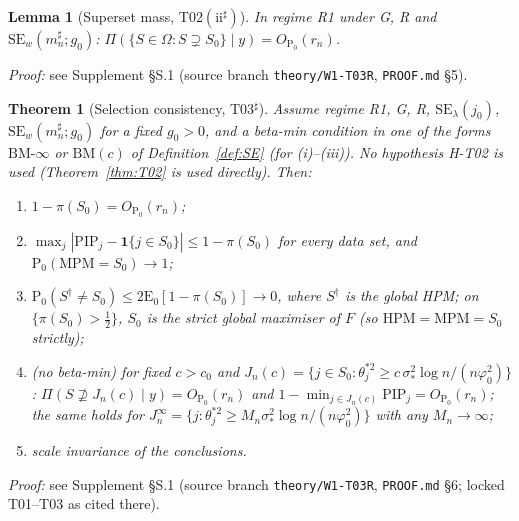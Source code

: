 \documentclass[11pt]{article}
\newtheorem{theorem}{Theorem}
\newtheorem{lemma}{Lemma}
\theoremstyle{definition}
\theoremstyle{remark}
\renewcommand{\Pr}{\mathrm{P}}
\newcommand{\E}{\mathrm{E}}
\newcommand{\Sz}{S_0}
\newcommand{\PIP}{\mathrm{PIP}}
\newcommand{\MPM}{\mathrm{MPM}}
\newcommand{\HPM}{\mathrm{HPM}}
\newcommand{\Ind}{\mathbf 1}
\begin{document}
\begin{lemma}[Superset mass, T02$(\mathrm{ii}^\sharp)$]\label{thm:T02ii}
In regime R1 under G, R and $\mathrm{SE}_w(m^\sharp_n;g_0)$: $\Pi(\{S\in\Omega:S\supsetneq\Sz\}\mid y)=O_{\Pr_0}(r_n)$.
\end{lemma}
\noindent\emph{Proof:} see Supplement \S S.1 (source branch \texttt{theory/W1-T03R}, \texttt{PROOF.md} \S5).

\begin{theorem}[Selection consistency, T03$^\sharp$]\label{thm:T03}
Assume regime R1, G, R, $\mathrm{SE}_\lambda(j_0)$, $\mathrm{SE}_w(m^\sharp_n;g_0)$ for a fixed $g_0>0$, and a beta-min condition
in one of the forms $\mathrm{BM}\text{-}\infty$ or $\mathrm{BM}(c)$ of Definition~\ref{def:SE} (for (i)--(iii)). No hypothesis H-T02 is used
(Theorem~\ref{thm:T02} is used directly). Then:
\begin{enumerate}
\item[(i)] $1-\pi(\Sz)=O_{\Pr_0}(r_n)$;
\item[(ii)] $\max_j|\PIP_j-\Ind\{j\in\Sz\}|\le1-\pi(\Sz)$ for \emph{every} data set, and $\Pr_0(\MPM=\Sz)\to1$;
\item[(iii)] $\Pr_0(S^\dagger\ne\Sz)\le2\E_0[1-\pi(\Sz)]\to0$, where $S^\dagger$ is the global HPM; on $\{\pi(\Sz)>\tfrac12\}$,
$\Sz$ is the strict global maximiser of $F$ (so $\HPM=\MPM=\Sz$ strictly);
\item[(iv)] (no beta-min) for fixed $c>c_0$ and $J_n(c)=\{j\in\Sz:\theta_j^{*2}\ge c\,\sigma_*^2\log n/(n\varphi_0^2)\}$:
$\Pi(S\not\supseteq J_n(c)\mid y)=O_{\Pr_0}(r_n)$ and $1-\min_{j\in J_n(c)}\PIP_j=O_{\Pr_0}(r_n)$; the same holds for
$J_n^\infty=\{j:\theta^{*2}_j\ge M_n\sigma_*^2\log n/(n\varphi_0^2)\}$ with any $M_n\to\infty$;
\item[(v)] scale invariance of the conclusions.
\end{enumerate}
\end{theorem}
\noindent\emph{Proof:} see Supplement \S S.1 (source branch \texttt{theory/W1-T03R}, \texttt{PROOF.md} \S6; locked T01--T03 as cited there).
\end{document}
